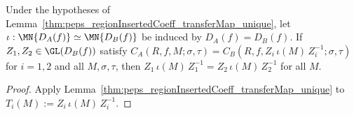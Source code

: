 \begin{lemma}
    \label{thm:peps_gaugeConj_eq_of_coeffIdentities}
    \leanok
    Under the hypotheses of Lemma~\ref{thm:peps_regionInsertedCoeff_transferMap_unique}, let $\iota:\MN{D_A(f)}\simeq\MN{D_B(f)}$ be induced by $D_A(f)=D_B(f)$. If $Z_1,Z_2\in\GL(D_B(f))$ satisfy $C_A(R,f,M;\sigma,\tau)=C_B(R,f,Z_i\,\iota(M)\,Z_i^{-1};\sigma,\tau)$ for $i=1,2$ and all $M,\sigma,\tau$, then $Z_1\,\iota(M)\,Z_1^{-1}=Z_2\,\iota(M)\,Z_2^{-1}$ for all $M$.
\end{lemma}
\begin{proof}\leanok
    Apply Lemma~\ref{thm:peps_regionInsertedCoeff_transferMap_unique} to $T_i(M):=Z_i\,\iota(M)\,Z_i^{-1}$.
\end{proof}

